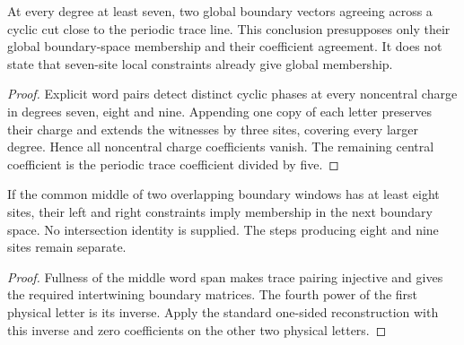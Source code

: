 \begin{lemma}
    \label{lem:short_volume_weyl_global_boundary_closure}
    \leanok
    At every degree at least seven, two global boundary vectors
    agreeing across a cyclic cut close to the periodic trace line.
    This conclusion presupposes only their global boundary-space
    membership and their coefficient agreement. It does not state that
    seven-site local constraints already give global membership.
\end{lemma}
\begin{proof}\leanok
    Explicit word pairs detect distinct cyclic phases at every noncentral
    charge in degrees seven, eight and nine. Appending one copy of each
    letter preserves their charge and extends the witnesses by three
    sites, covering every larger degree. Hence all noncentral charge
    coefficients vanish. The remaining central coefficient is the
    periodic trace coefficient divided by five.
\end{proof}

\begin{lemma}
    \label{lem:short_volume_weyl_long_intersection}
    \leanok
    If the common middle of two overlapping boundary windows has at
    least eight sites, their left and right constraints imply
    membership in the next boundary space. No intersection identity
    is supplied. The steps producing eight and nine sites remain separate.
\end{lemma}
\begin{proof}\leanok
    Fullness of the middle word span makes trace pairing
    injective and gives the required intertwining boundary matrices.
    The fourth power of the first physical letter is its inverse.
    Apply the standard one-sided reconstruction with this inverse and
    zero coefficients on the other two physical letters.
\end{proof}

